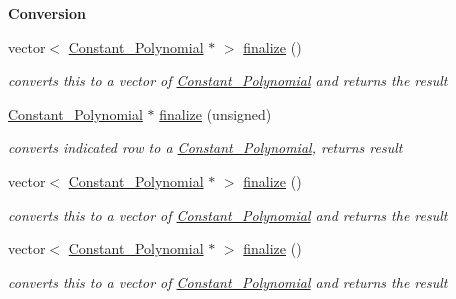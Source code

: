 \begin{Indent}\textbf{ Conversion}\par
\begin{DoxyCompactItemize}
\item 
\mbox{\label{group___g_b_computation_a6f70b5f5779e7aa262d454b9f2bbd2d1}} 
vector$<$ \hyperlink{group__polygroup_class_constant___polynomial}{Constant\+\_\+\+Polynomial} $\ast$ $>$ \hyperlink{group___g_b_computation_a6f70b5f5779e7aa262d454b9f2bbd2d1}{finalize} ()
\begin{DoxyCompactList}\small\item\em converts {\ttfamily this} to a vector of \hyperlink{group__polygroup_class_constant___polynomial}{Constant\+\_\+\+Polynomial} and returns the result \end{DoxyCompactList}\item 
\mbox{\label{group___g_b_computation_a8281d8f4316037e2bd53caf9e1930cb0}} 
\hyperlink{group__polygroup_class_constant___polynomial}{Constant\+\_\+\+Polynomial} $\ast$ \hyperlink{group___g_b_computation_a8281d8f4316037e2bd53caf9e1930cb0}{finalize} (unsigned)
\begin{DoxyCompactList}\small\item\em converts indicated row to a \hyperlink{group__polygroup_class_constant___polynomial}{Constant\+\_\+\+Polynomial}, returns result \end{DoxyCompactList}\item 
\mbox{\label{group___g_b_computation_acb8721524d3d30e98fe153ed08c21232}} 
vector$<$ \hyperlink{group__polygroup_class_constant___polynomial}{Constant\+\_\+\+Polynomial} $\ast$ $>$ \hyperlink{group___g_b_computation_acb8721524d3d30e98fe153ed08c21232}{finalize} ()
\begin{DoxyCompactList}\small\item\em converts {\ttfamily this} to a vector of \hyperlink{group__polygroup_class_constant___polynomial}{Constant\+\_\+\+Polynomial} and returns the result \end{DoxyCompactList}\item 
\mbox{\label{group___g_b_computation_acb8721524d3d30e98fe153ed08c21232}} 
vector$<$ \hyperlink{group__polygroup_class_constant___polynomial}{Constant\+\_\+\+Polynomial} $\ast$ $>$ \hyperlink{group___g_b_computation_acb8721524d3d30e98fe153ed08c21232}{finalize} ()
\begin{DoxyCompactList}\small\item\em converts {\ttfamily this} to a vector of \hyperlink{group__polygroup_class_constant___polynomial}{Constant\+\_\+\+Polynomial} and returns the result \end{DoxyCompactList}\end{DoxyCompactItemize}
\end{Indent}
